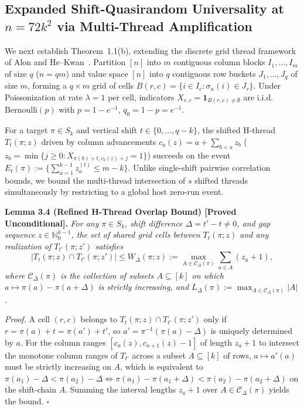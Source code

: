 \documentclass[
  11pt,
]{article}
\begin{document}
\subsection{\texorpdfstring{Expanded Shift-Quasirandom Universality at \(n = 72 k^2\) via Multi-Thread Amplification}{Expanded Shift-Quasirandom Universality at n = 72 k\^{}2 via Multi-Thread Amplification}}\label{sec:w9-quasirandom}

We next establish Theorem~1.1(b), extending the discrete grid thread framework of Alon and He--Kwan~\cite{ref-HK20}. Partition \([n]\) into \(m\) contiguous column blocks \(I_1, \dots, I_m\) of size \(q\) (\(n = qm\)) and value space \([n]\) into \(q\) contiguous row buckets \(J_1, \dots, J_q\) of size \(m\), forming a \(q \times m\) grid of cells \(B(r, c) = \{i \in I_c : \sigma_n(i) \in J_r\}\). Under Poissonization at rate \(\lambda = 1\) per cell, indicators \(X_{r,c} = \mathbf{1}_{B(r,c) \ne \emptyset}\) are i.i.d.\ \(\mathrm{Bernoulli}(p)\) with \(p = 1 - e^{-1}\), \(q_0 = 1 - p = e^{-1}\).

For a target \(\pi \in S_k\) and vertical shift \(t \in \{0, \dots, q-k\}\), the shifted H-thread \(T_t(\pi; z)\) driven by column advancements \(c_a(z) = a + \sum_{b < a} z_b\) (\(z_b = \min\{j \ge 0 : X_{\pi(b)+t, c_b(z)+j} = 1\}\)) succeeds on the event \(E_t(\pi) := \{\sum_{a=1}^{k-1} z_a^{(t)} \le m - k\}\). Unlike single-shift pairwise correlation bounds, we bound the multi-thread intersection of \(s\) shifted threads simultaneously by restricting to a global host zero-run event.

\textbf{Lemma 3.4 (Refined H-Thread Overlap Bound) [Proved Unconditional].}
\emph{For any \(\pi \in S_k\), shift difference \(\Delta = t' - t \ne 0\), and gap sequence \(z \in \mathbb{N}_0^{k-1}\), the set of shared grid cells between \(T_t(\pi; z)\) and any realization of \(T_{t'}(\pi; z')\) satisfies}
\begin{equation}
\left| T_t(\pi; z) \cap T_{t'}(\pi; z') \right| \le W_\Delta(\pi; z) := \max_{A \in \mathcal{C}_\Delta(\pi)} \sum_{a \in A} (z_a + 1),
\end{equation}
\emph{where \(\mathcal{C}_\Delta(\pi)\) is the collection of subsets \(A \subseteq [k]\) on which \(a \mapsto \pi(a) - \pi(a+\Delta)\) is strictly increasing, and \(L_\Delta(\pi) := \max_{A \in \mathcal{C}_\Delta(\pi)} |A|\).}

\emph{Proof.} A cell \((r, c)\) belongs to \(T_t(\pi; z) \cap T_{t'}(\pi; z')\) only if \(r = \pi(a) + t = \pi(a') + t'\), so \(a' = \pi^{-1}(\pi(a) - \Delta)\) is uniquely determined by \(a\). For the column ranges \([c_a(z), c_{a+1}(z) - 1]\) of length \(z_a + 1\) to intersect the monotone column ranges of \(T_{t'}\) across a subset \(A \subseteq [k]\) of rows, \(a \mapsto a'(a)\) must be strictly increasing on \(A\), which is equivalent to \(\pi(a_1) - \Delta < \pi(a_2) - \Delta \iff \pi(a_1) - \pi(a_1+\Delta) < \pi(a_2) - \pi(a_2+\Delta)\) on the shift-chain \(A\). Summing the interval lengths \(z_a + 1\) over \(A \in \mathcal{C}_\Delta(\pi)\) yields the bound. \(\square\)
\end{document}
